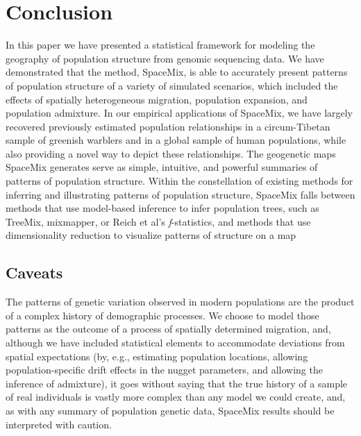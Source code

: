 \documentclass[12pt]{article}
\newcommand{\gc}[1]{{\it\color{blue}{(#1)}}}
\begin{document}
\section*{Conclusion}
In this paper we have presented a statistical framework for modeling the geography of population structure from genomic sequencing data.
We have demonstrated that the method, SpaceMix, is able to accurately present patterns of population structure of a variety of simulated scenarios, which included the effects of spatially heterogeneous migration, population expansion, and population admixture.  In our empirical applications of SpaceMix, we have largely recovered previously estimated population relationships in a circum-Tibetan sample of greenish warblers and in a global sample of human populations, while also providing a novel way to depict these relationships.  The geogenetic maps SpaceMix generates serve as simple, intuitive, and powerful summaries of patterns of population structure. Within the constellation of existing methods for inferring and illustrating patterns of population structure, SpaceMix falls between methods that use model-based inference to infer population trees, such as TreeMix, mixmapper, or Reich et al's \textit{f}-statistics, and methods that use dimensionality reduction to visualize patterns of structure on a map \gc{(PCA, SPA). }


\subsection*{Caveats}
The patterns of genetic variation observed in modern populations are the product of a complex history of demographic processes.  We choose to model those patterns as the outcome of a process of spatially determined migration, and, although we have included statistical elements to accommodate deviations from spatial expectations (by, e.g., estimating population locations, allowing population-specific drift effects in the nugget parameters, and allowing the inference of admixture), it goes without saying that the true history of a sample of real individuals is vastly more complex than any model we could create, 
and, as with any summary of population genetic data, 
SpaceMix results should be interpreted with caution.
\end{document}
